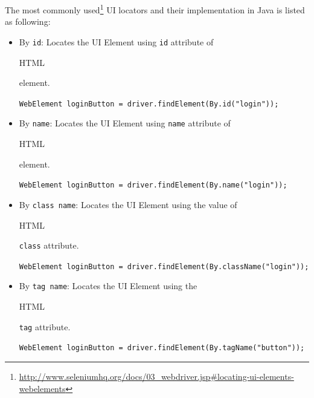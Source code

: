 The most commonly  used\footnote{\url{http://www.seleniumhq.org/docs/03_webdriver.jsp\#locating-ui-elements-webelements}} UI locators and their implementation in Java is listed as following:
\begin{itemize}
\item 
By \texttt{id}:
Locates the UI Element using \texttt{id} attribute of \begin{footnotesize} HTML\end{footnotesize} element.
\newline
\begin{footnotesize}
\texttt{WebElement loginButton = driver.findElement(By.id("login"));
}
\end{footnotesize}
\item 
By \texttt{name}:
Locates the UI Element using \texttt{name} attribute of \begin{footnotesize} HTML\end{footnotesize} element.
\newline
\begin{footnotesize}
\texttt{WebElement loginButton = driver.findElement(By.name("login"));
}
\end{footnotesize}
\item 
By \texttt{class name}:
Locates the UI Element using the value of \begin{footnotesize} HTML\end{footnotesize} \texttt{class} attribute.
\newline
\begin{footnotesize}
\texttt{WebElement loginButton = driver.findElement(By.className("login"));
}
\end{footnotesize}

\item 
By \texttt{tag name}:
Locates the UI Element using the \begin{footnotesize} HTML\end{footnotesize} \texttt{tag} attribute.
\newline
\begin{footnotesize}
\texttt{WebElement loginButton = driver.findElement(By.tagName("button"));
}
\end{footnotesize}


\end{itemize}
